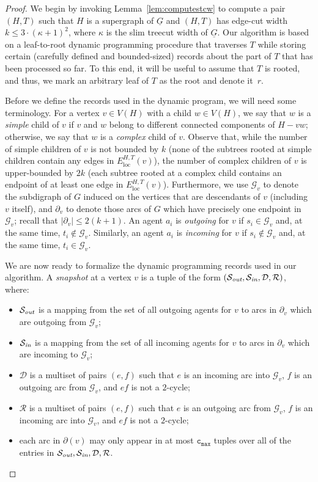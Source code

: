 \documentclass[letterpaper]{article} %
\newcommand{\cmax}{\mathtt{c_{max}}}
\newcommand{\loc}{\operatorname{loc}}
\newcommand{\forgottenG}{\mathcal{G}}
\renewcommand{\R}{\mathcal{R}}
\renewcommand{\D}{\mathcal{D}}
\newcommand{\Sout}{\mathcal{S}_\emph{out}}
\newcommand{\Sin}{\mathcal{S}_\emph{in}}
\begin{document}
\begin{proof}
We begin by invoking Lemma~\ref{lem:computestcw} to compute a pair $(H,T)$ such that $H$ is a supergraph of $\underline G$ and $(H,T)$ has edge-cut width $k\leq 3\cdot (\kappa+1)^2$, where $\kappa$ is the slim treecut width of $\underline G$. Our algorithm is based on a leaf-to-root dynamic programming procedure that traverses $T$ while storing certain (carefully defined and bounded-sized) records about the part of $T$ that has been processed so far. To this end, it will be useful to assume that $T$ is rooted, and thus, we mark an arbitrary leaf of $T$ as the root and denote it~$r$.


Before we define the records used in the dynamic program, we will need some terminology. For a vertex $v\in V(H)$ with a child $w\in V(H)$, we say that $w$ is a \emph{simple} child of $v$ if $v$ and $w$ belong to different connected components of $H-vw$; otherwise, we say that $w$ is a \emph{complex} child of $v$. Observe that, while the number of simple children of $v$ is not bounded by $k$ (none of the subtrees rooted at simple children contain any edges in $E_{\loc}^{H,T}(v)$), the number of complex children of $v$ is upper-bounded by $2k$ (each subtree rooted at a complex child contains an endpoint of at least one edge in $E_{\loc}^{H,T}(v)$). Furthermore, we use $\forgottenG_v$ to denote the subdigraph of $G$ induced on the vertices that are descendants of $v$ (including $v$ itself), and $\partial_v$ to denote those arcs of $G$ which have precisely one endpoint in $\forgottenG_v$; recall that $|\partial_v|\leq 2(k+1)$. An agent $a_i$ is \emph{outgoing} for $v$ if $s_i\in \forgottenG_v$ and, at the same time, $t_i\not \in \forgottenG_v$. Similarly, an agent $a_i$ is \emph{incoming} for $v$ if $s_i\notin \forgottenG_v$ and, at the same time, $t_i \in \forgottenG_v$.

We are now ready to formalize the dynamic programming records used in our algorithm. A \emph{snapshot} at a vertex $v$ is a tuple of the form $(\Sout,\Sin,\D,\R)$, where:

	\begin{itemize}[topsep=0pt]
		\item $\Sout$ is a mapping from the set of all outgoing agents for $v$ to arcs in $\partial_v$ which are outgoing from $\forgottenG_v$;
		\item $\Sin$ is a mapping from the set of all incoming agents for $v$ to arcs in $\partial_v$  which are incoming to $\forgottenG_v$;
		\item $\D$ is a multiset of pairs $(e,f)$ such that $e$ is an incoming arc into $\forgottenG_v$, $f$ is an outgoing arc from $\forgottenG_v$, and $ef$ is not a $2$-cycle;
		\item $\R$ is a multiset of pairs $(e,f)$ such that $e$ is an outgoing arc from $\forgottenG_v$, $f$ is an incoming arc into $\forgottenG_v$, and $ef$ is not a $2$-cycle;
		\item each arc in $\partial(v)$ may only appear in at most $\cmax$ tuples over all of the entries in $\Sout, \Sin, \D, \R$.
	\end{itemize}


\end{proof}
\end{document}
